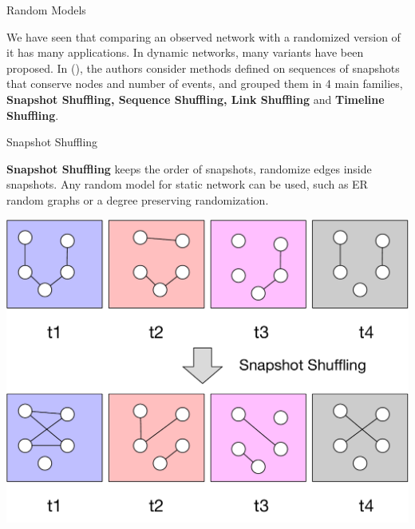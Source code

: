 \documentclass[a4paper,11pt]{book}
\begin{document}
\begin{textbox}{Random Models}

We have seen that comparing an observed network with a randomized version of it has many applications. In dynamic networks, many variants have been proposed. In (\cite{gauvin2018randomized}), the authors consider methods defined on sequences of snapshots that conserve nodes and number of events, and grouped them in 4 main families, \textbf{Snapshot Shuffling, Sequence Shuffling, Link Shuffling} and \textbf{Timeline Shuffling}.

\end{textbox}




\begin{textbox}{Snapshot Shuffling}

 \textbf{Snapshot Shuffling} keeps the order of snapshots, randomize edges inside snapshots. Any random model for static network can be used, such as ER random graphs or a degree preserving randomization.
 
 
 
\centering
\colorbox{white}{\includegraphics[width=0.8\linewidth]{pics/dynamic/snapshot_shuffling.pdf}}
 
\end{textbox}
\end{document}
